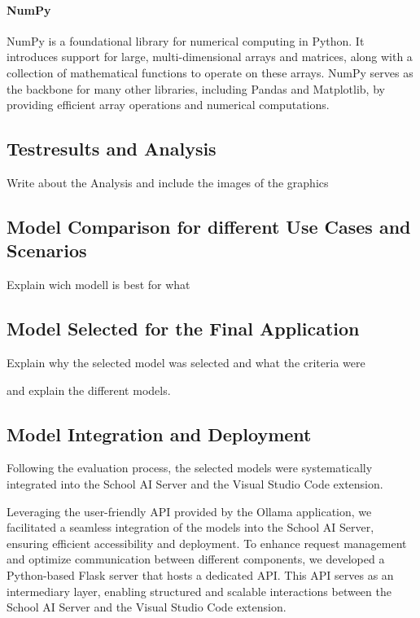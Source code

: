 \cite{seaborn}

\paragraph{NumPy}

NumPy is a foundational library for numerical computing in Python. It introduces support for large, multi-dimensional arrays and matrices, along with a collection of mathematical functions to operate on these arrays. NumPy serves as the backbone for many other libraries, including Pandas and Matplotlib, by providing efficient array operations and numerical computations.

\cite{numpy}



\subsection{Testresults and Analysis}

Write about the Analysis and include the images of the graphics

\subsection{Model Comparison for different Use Cases and Scenarios}

Explain wich modell is best for what

\subsection{Model Selected for the Final Application}

Explain why the selected model was selected and what the criteria were

and explain the different models.

\subsection{Model Integration and Deployment}

Following the evaluation process, the selected models were systematically integrated into the School AI Server and the Visual Studio Code extension. 

Leveraging the user-friendly API provided by the Ollama application, we facilitated a seamless integration of the models into the School AI Server, ensuring efficient accessibility and deployment. To enhance request management and optimize communication between different components, we developed a Python-based Flask server that hosts a dedicated API. This API serves as an intermediary layer, enabling structured and scalable interactions between the School AI Server and the Visual Studio Code extension.

